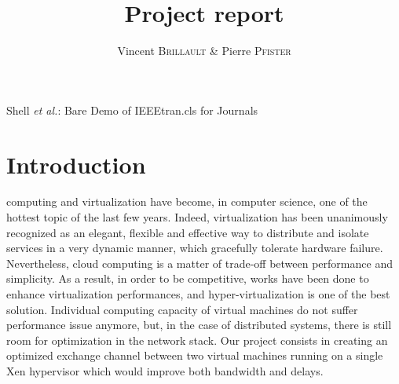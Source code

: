 \documentclass[journal]{IEEEtran}
\begin{document}
\title{Project report}

\author{Vincent B\textsc{rillault} \& Pierre P\textsc{fister}}%


%
{Shell \MakeLowercase{\textit{et al.}}: Bare Demo of IEEEtran.cls for Journals}
\maketitle





\begin{abstract}
\boldmath
\end{abstract}
%






\section{Introduction}

 computing and virtualization have become, in computer science, one of the hottest topic of the last few years.
Indeed, virtualization has been unanimously recognized as an elegant, flexible and effective way to distribute and isolate services in a very dynamic manner, which gracefully tolerate hardware failure.
Nevertheless, cloud computing is a matter of trade-off between performance and simplicity.
As a result, in order to be competitive, works have been done to enhance virtualization performances, and hyper-virtualization is one of the best solution.
Individual computing capacity of virtual machines do not suffer performance issue anymore, but, in the case of distributed systems, there is still room for optimization in the network stack.
Our project consists in creating an optimized exchange channel between two virtual machines running on a single Xen hypervisor which would improve both bandwidth and delays.
\end{document}
